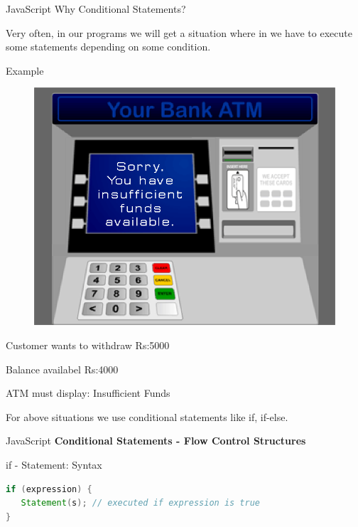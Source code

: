 \documentclass[14pt]{beamer}
\begin{document}
\begin{frame}{JavaScript}
Why Conditional Statements?

\vspace{1pc}
Very often, in our programs we will get a situation where in we have to execute some statements depending on some condition. 
\begin{block}{Example}
\begin{minipage}{2cm}
\begin{figure}[H]
\includegraphics[scale=.1]{conditional-statements.png}
\end{figure}
\end{minipage}
\quad
\begin{minipage}{8cm}
\small
Customer wants to withdraw Rs:5000

Balance availabel Rs:4000

ATM must display: Insufficient Funds
\end{minipage}
\end{block}
For above situations we use conditional statements like if, if-else.
\end{frame}

\begin{frame}[fragile]{JavaScript}
\textbf{Conditional Statements - Flow Control Structures}

\vspace{1pc}
\begin{block}{if - Statement: Syntax}
\begin{lstlisting}[language=java]
if (expression) {
   Statement(s); // executed if expression is true
}
\end{lstlisting}
\end{block}
\end{frame}
\end{document}

